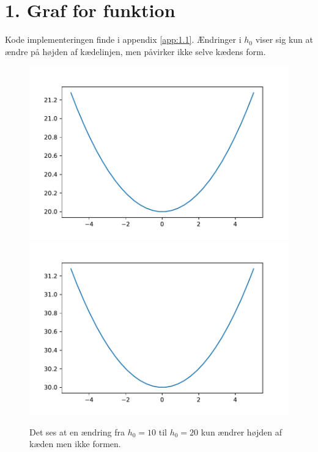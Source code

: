 \section*{1. Graf for funktion}
Kode implementeringen finde i appendix \ref{app:1.1}.
% 
Ændringer i $h_0$ viser sig kun at ændre på højden af kædelinjen, men påvirker ikke selve kædens form. 
%
\begin{figure}[h!]
\includegraphics[scale=0.5]{code/fig1}
\includegraphics[scale=0.5]{code/fig2}
\caption{Det ses at en ændring fra $h_0=10$ til $h_0=20$ kun ændrer højden af kæden men ikke formen.}
\end{figure}
%
